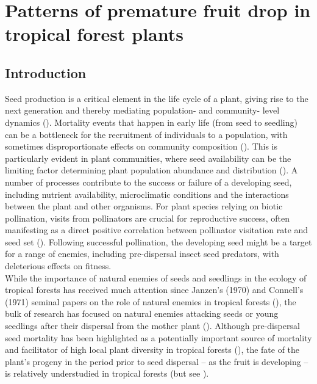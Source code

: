 \chapter{Patterns of premature fruit drop in tropical forest plants}

\section{Introduction}
Seed production is a critical element in the life cycle of a plant, giving rise to the next generation and thereby mediating population- and community- level dynamics (\cite{clarkArePlantPopulations2007a, maronHerbivoryEffectsPlant2006, turnbullArePlantPopulations2000, greenNonrandomDiversifyingProcesses2014}). Mortality events that happen in early life (from seed to seedling) can be a bottleneck for the recruitment of individuals to a population, with sometimes disproportionate effects on community composition (\cite{roughgardenRecruitmentDynamicsComplex1988}). This is particularly evident in plant communities, where seed availability can be the limiting factor determining plant population abundance and distribution (\cite{jamesDemographicProcessesLimiting2011,fennerEcologySeeds2005,rotherDemographicBottlenecksTropical2013}). A number of processes contribute to the success or failure of a developing seed, including nutrient availability, microclimatic conditions and the interactions between the plant and other organisms. For plant species relying on biotic pollination, visits from pollinators are crucial for reproductive success, often manifesting as a direct positive correlation between pollinator visitation rate and seed set (\cite{karronMultiplePollinatorVisits2006, steffan-dewenterPollinationSeedSet2001}). Following successful pollination, the developing seed might be a target for a range of enemies, including pre-dispersal insect seed predators, with deleterious effects on fitness. \\

While the importance of natural enemies of seeds and seedlings in the ecology of tropical forests has received much attention since Janzen’s (1970) and Connell’s (1971) seminal papers on the role of natural enemies in tropical forests (\cite{harmsPervasiveDensitydependentRecruitment2000, bagchiPathogensInsectHerbivores2014}), the bulk of research has focused on natural enemies attacking seeds or young seedlings after their dispersal from the mother plant (\cite{comitaTestingPredictionsJanzenConnell2014, hollEffectsSpeciesHabitat1997, leviTropicalForestsCan2019}). Although pre-dispersal seed mortality has been highlighted as a potentially important source of mortality and facilitator of high local plant diversity in tropical forests (\cite{ janzenHerbivoresNumberTree1970}), the fate of the plant’s progeny in the period prior to seed dispersal – as the fruit is developing – is relatively understudied in tropical forests (but see \cite{jonesDensitydependentPredispersalSeed2010}).\\

